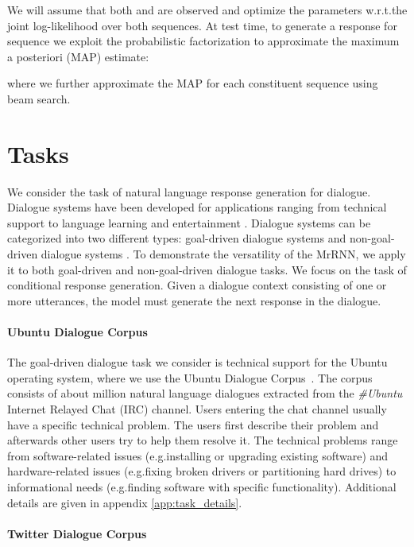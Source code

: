 \documentclass{article}
\begin{document}
We will assume that both  and  are observed and optimize the parameters w.r.t.\@ the joint log-likelihood over both sequences. At test time, to generate a response for sequence  we exploit the probabilistic factorization to approximate the maximum a posteriori (MAP) estimate:

where we further approximate the MAP for each constituent sequence using beam search.  
\section{Tasks}
We consider the task of natural language response generation for dialogue.
Dialogue systems have been developed for applications ranging from technical support to language learning and entertainment \cite{young2013pomdp,shawar2007chatbots}. 
Dialogue systems can be categorized into two different types: goal-driven dialogue systems
and non-goal-driven dialogue systems 
\cite{DBLP:journals/corr/SerbanLCP15}.
To demonstrate the versatility of the MrRNN, we apply it to both goal-driven and non-goal-driven dialogue tasks.
We focus on the task of conditional response generation.
Given a dialogue context consisting of one or more utterances, the model must generate the next response in the dialogue.




\paragraph{Ubuntu Dialogue Corpus}


The goal-driven dialogue task we consider is technical support for the Ubuntu operating system, where we use the Ubuntu Dialogue Corpus~\cite{lowe2015ubuntu}.
The corpus consists of about  million natural language dialogues extracted from the \textit{\#Ubuntu} Internet Relayed Chat (IRC) channel.
Users entering the chat channel usually have a specific technical problem. The users first describe their problem and afterwards other users try to help them resolve it.
The technical problems range from software-related issues (e.g.\@ installing or upgrading existing software) and hardware-related issues (e.g.\@ fixing broken drivers or partitioning hard drives) to informational needs (e.g.\@ finding software with specific functionality).
Additional details are given in appendix \ref{app:task_details}.

\paragraph{Twitter Dialogue Corpus}
\end{document}
